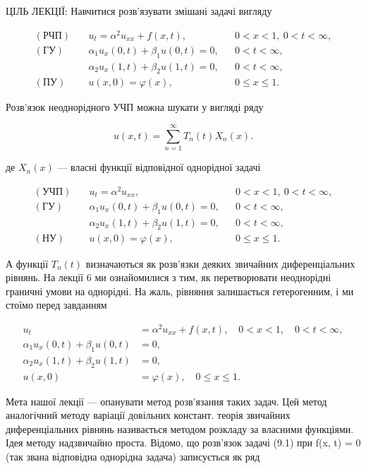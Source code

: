 \documentclass[
  ukrainian,
]{article}
\begin{document}
ЦІЛЬ ЛЕКЦІЇ: Навчитися розв'язувати змішані задачі вигляду

\[
\begin{aligned}
(\text{РЧП})\quad & u_t = \alpha^2 u_{xx} + f(x,t), && 0 < x < 1,\ 0 < t < \infty, \\
(\text{ГУ})\quad & \alpha_1 u_x(0,t) + \beta_1 u(0,t) = 0, && 0 < t < \infty, \\
& \alpha_2 u_x(1,t) + \beta_2 u(1,t) = 0, && 0 < t < \infty, \\
(\text{ПУ})\quad & u(x,0) = \varphi(x), && 0 \leqslant x \leqslant 1.
\end{aligned}
\]

Розв'язок неоднорідного УЧП можна шукати у вигляді ряду

\[
u(x,t) = \sum_{n=1}^{\infty} T_n(t) X_n(x).
\]

де \(X_n(x)\) --- власні функції відповідної однорідної задачі

\[
\begin{aligned}
(\text{УЧП})\quad & u_t = \alpha^2 u_{xx}, && 0 < x < 1,\ 0 < t < \infty, \\
(\text{ГУ})\quad & \alpha_1 u_x(0,t) + \beta_1 u(0,t) = 0, && 0 < t < \infty, \\
& \alpha_2 u_x(1,t) + \beta_2 u(1,t) = 0, && 0 < t < \infty, \\
(\text{НУ})\quad & u(x,0) = \varphi(x), && 0 \leqslant x \leqslant 1.
\end{aligned}
\]

А функції \(T_n(t)\) визначаються як розв'язки деяких звичайних
диференціальних рівнянь. На лекції 6 ми ознайомилися з тим, як
перетворювати неоднорідні граничні умови на однорідні. На жаль, рівняння
залишається гетерогенним, і ми стоїмо перед завданням

\[
\begin{aligned}
u_{t} &= \alpha^{2} u_{xx} + f(x, t), \quad 0 < x < 1, \quad 0 < t < \infty,\\
\alpha_{1} u_{x}(0, t) + \beta_{1} u(0, t) &= 0, \\
\alpha_{2} u_{x}(1, t) + \beta_{2} u(1, t) &= 0, \\
u(x, 0) &= \varphi(x), \quad 0 \le x \le 1.
\end{aligned}
\]

Мета нашої лекції --- опанувати метод розв'язання таких задач. Цей метод
аналогічний методу варіації довільних констант. теорія звичайних
диференціальних рівнянь називається методом розкладу за власними
функціями. Ідея методу надзвичайно проста. Відомо, що розв'язок задачі
(9.1) при f(x, t) = 0 (так звана відповідна однорідна задача)
записується як ряд
\end{document}
